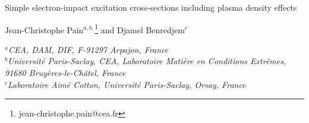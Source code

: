 \documentclass[a4paper,10pt]{article}
\begin{document}
\newcommand{\bin}[2]{\left(\begin{array}{c}\!#1\!\\\!#2\!\end{array}\right)}
\newcommand{\threej}[6]{\left(\begin{array}{ccc}#1 & #2 & #3 \\ #4 & #5 & #6 \end{array}\right)}
\newcommand{\sixj}[6]{\left\{\begin{array}{ccc}#1 & #2 & #3 \\ #4 & #5 & #6 \end{array}\right\}}
\newcommand{\regge}[9]{\left[\begin{array}{ccc}#1 & #2 & #3 \\ #4 & #5 & #6 \\ #7 & #8 & #9 \end{array}\right]}
\newcommand{\La}[6]{\left[\begin{array}{ccc}#1 & #2 & #3 \\ #4 & #5 & #6 \end{array}\right]}
\newcommand{\hj}{\hat{J}}
\newcommand{\hux}{\hat{J}_{1x}}
\newcommand{\hdx}{\hat{J}_{2x}}
\newcommand{\huy}{\hat{J}_{1y}}
\newcommand{\hdy}{\hat{J}_{2y}}
\newcommand{\huz}{\hat{J}_{1z}}
\newcommand{\hdz}{\hat{J}_{2z}}
\newcommand{\hup}{\hat{J}_1^+}
\newcommand{\hum}{\hat{J}_1^-}
\newcommand{\hdp}{\hat{J}_2^+}
\newcommand{\hdm}{\hat{J}_2^-}

\huge

\begin{center}
Simple electron-impact excitation cross-sections including plasma density effects
\end{center}

\vspace{0.5cm}

\large

\begin{center}
Jean-Christophe Pain$^{a,b,}$\footnote{jean-christophe.pain@cea.fr} and Djamel Benredjem$^c$
\end{center}

\normalsize

\begin{center}
\it $^a$CEA, DAM, DIF, F-91297 Arpajon, France\\
\it $^b$Universit\'e Paris-Saclay, CEA, Laboratoire Mati\`ere en Conditions Extr\^emes,\\
\it 91680 Bruy\`eres-le-Ch\^atel, France\\
\it $^c$Laboratoire Aim\'e Cotton, Universit\'e Paris-Saclay, Orsay, France
\end{center}
\end{document}
